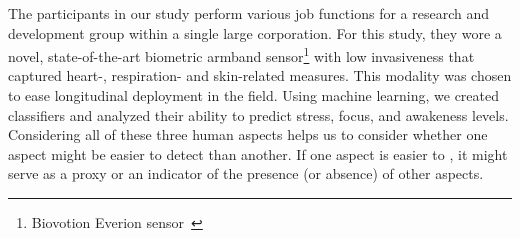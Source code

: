
The participants in
our study perform various job functions for a research and
development group within a single large corporation. For this study, they wore a novel, state-of-the-art
biometric armband sensor\footnote{Biovotion Everion
  sensor~\cite{everion}} with low invasiveness that captured heart-,
respiration- and skin-related measures. This modality was chosen to
ease longitudinal deployment in the field. Using machine learning, we
created classifiers and analyzed their ability to predict stress, focus, and awakeness levels. Considering all of these three human aspects helps us to consider whether one aspect might be easier to detect than another. If one aspect is easier to , it might serve
as a proxy or an indicator of the presence (or absence) of other aspects.

